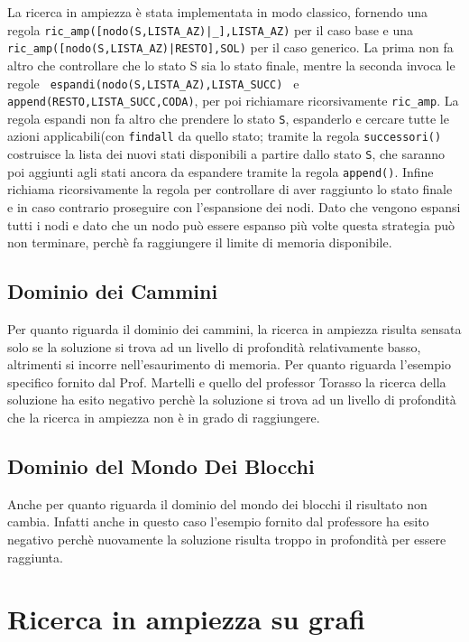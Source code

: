 La ricerca in ampiezza è stata implementata in modo classico, fornendo una regola \lstinline{ric_amp([nodo(S,LISTA_AZ)|_],LISTA_AZ)} per il caso base e una \lstinline{ric_amp([nodo(S,LISTA_AZ)|RESTO],SOL)} per il caso generico.
La prima non fa altro che controllare che lo stato S sia lo stato finale, mentre la seconda invoca le regole \lstinline{ espandi(nodo(S,LISTA_AZ),LISTA_SUCC) } e \lstinline{append(RESTO,LISTA_SUCC,CODA)}, per poi richiamare ricorsivamente \lstinline{ric_amp}.
La regola espandi non fa altro che prendere lo stato \lstinline{S}, espanderlo e cercare tutte le azioni applicabili(con \lstinline{findall} da quello stato; tramite la regola \lstinline{successori()} costruisce la lista dei nuovi stati disponibili a partire dallo stato \lstinline{S}, che saranno poi aggiunti agli stati ancora da espandere tramite la regola \lstinline{append()}.
Infine richiama ricorsivamente la regola per controllare di aver raggiunto lo stato finale e in caso contrario proseguire con l'espansione dei nodi.
Dato che vengono espansi tutti i nodi e dato che un nodo può essere espanso più volte questa strategia può non terminare, perchè fa raggiungere il limite di memoria disponibile.

\subsection{Dominio dei Cammini}
Per quanto riguarda il dominio dei cammini, la ricerca in ampiezza risulta sensata solo se la soluzione si trova ad un livello di profondità relativamente basso, altrimenti si incorre nell'esaurimento di memoria. Per quanto riguarda l'esempio specifico fornito dal Prof. Martelli e quello del professor Torasso la ricerca della soluzione ha esito negativo perchè la soluzione si trova ad un livello di profondità che la ricerca in ampiezza non è in grado di raggiungere.

\subsection{Dominio del Mondo Dei Blocchi}
Anche per quanto riguarda il dominio del mondo dei blocchi il risultato non cambia. Infatti anche in questo caso l'esempio fornito dal professore ha esito negativo perchè nuovamente la soluzione risulta troppo in profondità per essere raggiunta.
\newpage
\section{Ricerca in ampiezza su grafi}

